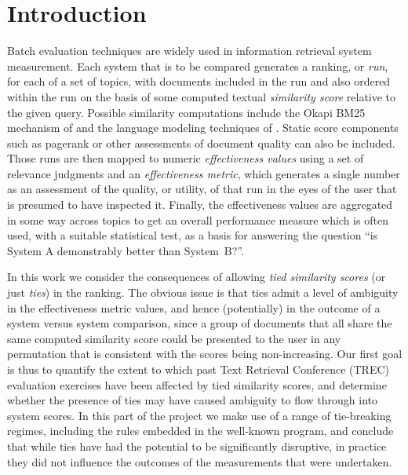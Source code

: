 \section{Introduction}
\label{sec-intro}

Batch evaluation techniques are widely used in information retrieval
system measurement.
Each system that is to be compared generates a ranking, or
{\emph{run}}, for each of a set of topics, with documents included in
the run and also ordered within the run on the basis of some computed
textual {\emph{similarity score}} relative to the given query.
Possible similarity computations include the Okapi BM25 mechanism of
{\citet{rwjhg94trec}} and the language modeling techniques of
{\citet{pc98sigir}}.
Static score components such as pagerank or other assessments of
document quality can also be included.
Those runs are then mapped to numeric {\emph{effectiveness values}}
using a set of relevance judgments and an {\emph{effectiveness
metric}}, which generates a single number as an assessment of the
quality, or utility, of that run in the eyes of the user that is
presumed to have inspected it.
Finally, the effectiveness values are aggregated in some way across
topics to get an overall performance measure which is often used,
with a suitable statistical test, as a basis for answering the
question ``is System A demonstrably better than System~B?''.

In this work we consider the consequences of allowing {\emph{tied
similarity scores}} (or just {\emph{ties}}) in the ranking.
The obvious issue is that ties admit a level of ambiguity in the
effectiveness metric values, and hence (potentially) in the outcome
of a system versus system comparison, since a group of documents that
all share the same computed similarity score could be presented to
the user in any permutation that is consistent with the scores being
non-increasing.
Our first goal is thus to quantify the extent to which past Text
Retrieval Conference (TREC) evaluation exercises have been affected
by tied similarity scores, and determine whether the presence of
ties may have caused ambiguity to flow through into system
scores.
In this part of the project we make use of a range of tie-breaking
regimes, including the rules embedded in the well-known
{\treceval} program, and conclude that while ties have had the
potential to be significantly disruptive, in practice they did not
influence the outcomes of the measurements that were undertaken.

